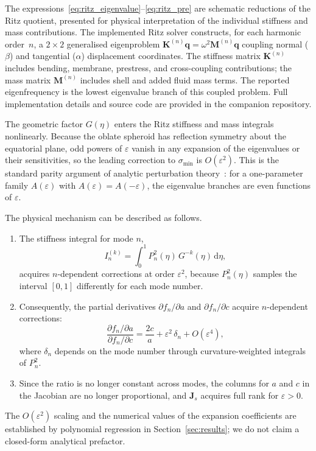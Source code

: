 The expressions~\eqref{eq:ritz_eigenvalue}--\eqref{eq:ritz_pre} are
schematic reductions of the Ritz quotient, presented for physical
interpretation of the individual stiffness and mass contributions.  The
implemented Ritz solver constructs, for each harmonic order~$n$, a $2\times2$
generalised eigenproblem $\mathbf{K}^{(n)}\mathbf{q}
= \omega^2\mathbf{M}^{(n)}\mathbf{q}$ coupling normal ($\beta$) and
tangential ($\alpha$) displacement coordinates.  The stiffness matrix
$\mathbf{K}^{(n)}$ includes bending, membrane, prestress, and
cross-coupling contributions; the mass matrix $\mathbf{M}^{(n)}$ includes
shell and added fluid mass terms.  The reported eigenfrequency is the
lowest eigenvalue branch of this coupled problem.  Full implementation
details and source code are provided in the companion repository.

\begin{remark}\label{prop:eccentricity}
The geometric factor $G(\eta)$ enters the Ritz stiffness and mass integrals
nonlinearly.  Because the oblate spheroid has reflection symmetry about the
equatorial plane, odd powers of $\varepsilon$ vanish in any expansion of the
eigenvalues or their sensitivities, so the leading correction to
$\sigma_{\min}$ is $O(\varepsilon^2)$.  This is the standard parity argument
of analytic perturbation theory~\cite{Kato1966,StewartSun1990}: for a
one-parameter family $A(\varepsilon)$ with $A(\varepsilon) = A(-\varepsilon)$,
the eigenvalue branches are even functions of $\varepsilon$.

The physical mechanism can be described as follows.
\begin{enumerate}
  \item The stiffness integral for mode $n$,
  \begin{equation}\label{eq:Ink}
    I_n^{(k)} = \int_0^1 P_n^2(\eta)\, G^{-k}(\eta)\,\mathrm{d}\eta,
  \end{equation}
  acquires $n$-dependent corrections at order $\varepsilon^2$, because
  $P_n^2(\eta)$ samples the interval $[0,1]$ differently for each mode number.

  \item Consequently, the partial derivatives $\partial f_n / \partial a$ and
  $\partial f_n / \partial c$ acquire $n$-dependent corrections:
  \begin{equation}\label{eq:ratio_corrected}
    \frac{\partial f_n / \partial a}
         {\partial f_n / \partial c}
    = \frac{2c}{a} + \varepsilon^2\,\delta_n + O(\varepsilon^4),
  \end{equation}
  where $\delta_n$ depends on the mode number through curvature-weighted
  integrals of $P_n^2$.

  \item Since the ratio is no longer constant across modes, the columns for $a$
  and $c$ in the Jacobian are no longer proportional, and
  $\mathbf{J}_s$ acquires full rank for $\varepsilon > 0$.
\end{enumerate}
The $O(\varepsilon^2)$ scaling and the numerical values of the expansion
coefficients are established by polynomial regression in
Section~\ref{sec:results}; we do not claim a closed-form analytical prefactor.
\end{remark}

